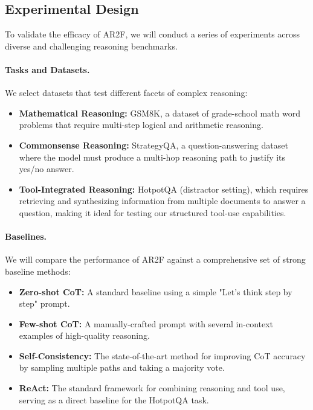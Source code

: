 \documentclass{article}
\begin{document}
\subsection{Experimental Design}
To validate the efficacy of AR2F, we will conduct a series of experiments across diverse and challenging reasoning benchmarks.

\paragraph{Tasks and Datasets.} We select datasets that test different facets of complex reasoning:
\begin{itemize}
    \item \textbf{Mathematical Reasoning:} GSM8K, a dataset of grade-school math word problems that require multi-step logical and arithmetic reasoning.
    \item \textbf{Commonsense Reasoning:} StrategyQA, a question-answering dataset where the model must produce a multi-hop reasoning path to justify its yes/no answer.
    \item \textbf{Tool-Integrated Reasoning:} HotpotQA (distractor setting), which requires retrieving and synthesizing information from multiple documents to answer a question, making it ideal for testing our structured tool-use capabilities.
\end{itemize}

\paragraph{Baselines.} We will compare the performance of AR2F against a comprehensive set of strong baseline methods:
\begin{itemize}
    \item \textbf{Zero-shot CoT:} A standard baseline using a simple "Let's think step by step" prompt.
    \item \textbf{Few-shot CoT:} A manually-crafted prompt with several in-context examples of high-quality reasoning.
    \item \textbf{Self-Consistency:} The state-of-the-art method for improving CoT accuracy by sampling multiple paths and taking a majority vote.
    \item \textbf{ReAct:} The standard framework for combining reasoning and tool use, serving as a direct baseline for the HotpotQA task.       
\end{itemize}
\end{document}
